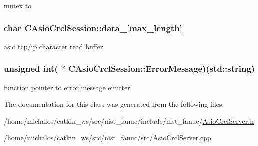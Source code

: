 mutex to \hypertarget{classCAsioCrclSession_a1326999cd8dde70d8d69a4243ccba767}{
\subsubsection[{data\-\_\-}]{\setlength{\rightskip}{0pt plus 5cm}char C\-Asio\-Crcl\-Session\-::data\-\_\-\mbox{[}{\bf max\-\_\-length}\mbox{]}\hspace{0.3cm}{\ttfamily [protected]}}}\label{classCAsioCrclSession_a1326999cd8dde70d8d69a4243ccba767}
asio tcp/ip character read buffer \hypertarget{classCAsioCrclSession_a1bd7e2c7fd02f1445f000248d908d069}{
\subsubsection[{Error\-Message}]{\setlength{\rightskip}{0pt plus 5cm}unsigned int( $\ast$ C\-Asio\-Crcl\-Session\-::\-Error\-Message)(std\-::string)\hspace{0.3cm}{\ttfamily [protected]}}}\label{classCAsioCrclSession_a1bd7e2c7fd02f1445f000248d908d069}
function pointer to error message emitter 

The documentation for this class was generated from the following files\-:\begin{DoxyCompactItemize}
\item 
/home/michalos/catkin\-\_\-ws/src/nist\-\_\-fanuc/include/nist\-\_\-fanuc/\hyperlink{AsioCrclServer_8h}{Asio\-Crcl\-Server.\-h}\item 
/home/michalos/catkin\-\_\-ws/src/nist\-\_\-fanuc/src/\hyperlink{AsioCrclServer_8cpp}{Asio\-Crcl\-Server.\-cpp}\end{DoxyCompactItemize}

